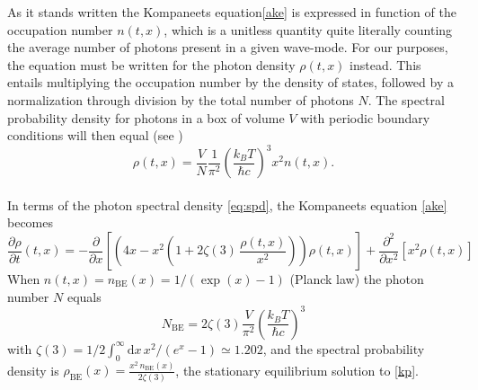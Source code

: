 \documentclass[a4paper,12pt,reqno,superscriptaddress,nofootinbib]{revtex4}
\theoremstyle{plain}
\theoremstyle{definition}
\theoremstyle{remark}
\newcommand{\id}{\textrm{d}}
\newcommand{\0}{^{(0)}}
\newcommand{\1}{^{(1)}}
\newcommand{\2}{^{(2)}}
\begin{document}
As it stands written the Kompaneets equation\eqref{ake} is expressed in function of the occupation number $n(t,x)$, which is a unitless quantity quite literally counting the average number of photons present in a given wave-mode. For our purposes, the equation must be written for the photon density $\rho(t,x)$ instead. This entails multiplying the occupation number by the density of states, followed by a normalization through division by the total number of photons $N$. The spectral probability density for photons in a box of volume $V$ with periodic boundary conditions will then equal (see \cite{paper2})
\begin{equation}\label{eq:spd}
\rho(t,x) = \frac{V}{N} \frac{1}{\pi^2} \left(\frac{k_B T}{\hbar c}\right)^3 
x^2 n(t,x)%
.\end{equation}
\\
In terms of the photon spectral density \eqref{eq:spd}, the Kompaneets equation \eqref{ake} becomes
\begin{equation}\label{kp}
\frac{\partial \rho}{\partial t} (t,x) = -\frac{\partial}{\partial x}\left[\left(4x- x^2\left(1+2\zeta(3) \,\frac{\rho(t,x)}{x^2}\right)\right)\rho(t,x)\right] + \frac{\partial^2}{\partial x^2}\left[x^2 \rho(t,x)\right]
\end{equation}
When $n(t,x)= n_\text{BE}(x) = 1 / (\exp(x) - 1)$ (Planck law) the photon number 
$N$ equals
\[
N_\text{BE} = 2 \zeta(3) \frac{V}{\pi^2} \left( \frac{k_B T}{\hbar c} \right)^3
\]
with $\zeta(3) = 1/2 \int_0^\infty \id x \,x^2/(e^x-1) \simeq 1.202$, and the spectral probability density is $ \rho_\text{BE}(x) = \frac{x^2\, n_\text{BE}(x)}{2\zeta(3)}$, the stationary equilibrium solution to \eqref{kp}.
\end{document}
